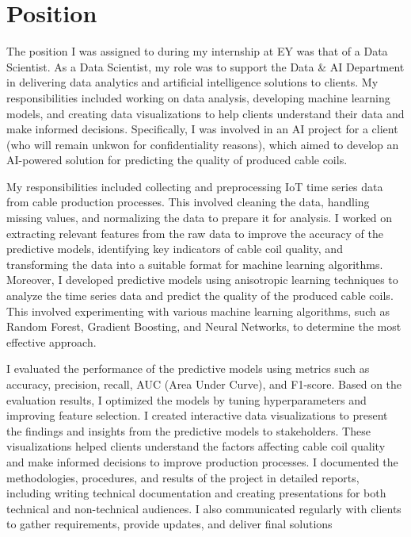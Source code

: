 \section{Position}

The position I was assigned to during my internship at EY was that of a Data
Scientist. As a Data Scientist, my role was to support the Data \& AI
Department in delivering data analytics and artificial intelligence solutions
to clients. My responsibilities included working on data analysis, developing
machine learning models, and creating data visualizations to help clients
understand their data and make informed decisions. Specifically, I was involved
in an AI project for a client (who will remain unkwon for confidentiality reasons),
which aimed to develop an AI-powered solution for predicting the quality of
produced cable coils.

My responsibilities included collecting and preprocessing IoT time series data
from cable production processes. This involved cleaning the data, handling
missing values, and normalizing the data to prepare it for analysis. I worked
on extracting relevant features from the raw data to improve the accuracy of
the predictive models, identifying key indicators of cable coil quality, and
transforming the data into a suitable format for machine learning algorithms.
Moreover, I developed predictive models using anisotropic learning techniques
to analyze the time series data and predict the quality of the produced cable
coils. This involved experimenting with various machine learning algorithms,
such as Random Forest, Gradient Boosting, and Neural Networks, to determine the
most effective approach.

I evaluated the performance of the predictive models using metrics such as
accuracy, precision, recall, AUC (Area Under Curve), and F1-score. Based on the
evaluation results, I optimized the models by tuning hyperparameters and
improving feature selection. I created interactive data visualizations to
present the findings and insights from the predictive models to stakeholders.
These visualizations helped clients understand the factors affecting cable coil
quality and make informed decisions to improve production processes. I
documented the methodologies, procedures, and results of the project in
detailed reports, including writing technical documentation and creating
presentations for both technical and non-technical audiences. I also
communicated regularly with clients to gather requirements, provide updates,
and deliver final solutions

